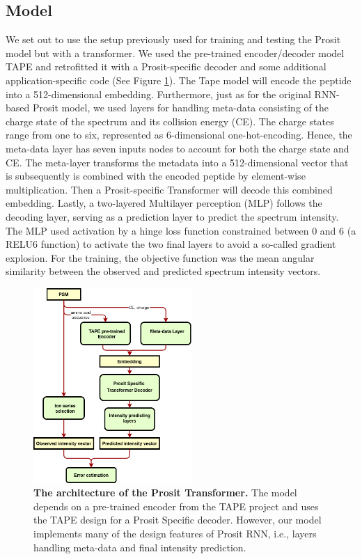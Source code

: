 \documentclass[10pt,a4paper]{article}
\begin{document}
\subsection*{Model}
We set out to use the setup previously used for training and testing the Prosit model but with a transformer. We used the pre-trained encoder/decoder model TAPE \cite{Rao2019-qq} and retrofitted it with a Prosit-specific decoder and some additional application-specific code (See Figure \ref{fig:architecture}). The Tape model will encode the peptide into a 512-dimensional embedding. Furthermore, just as for the original RNN-based Prosit model, we used layers for handling meta-data consisting of the charge state of the spectrum and its collision energy (CE). The charge states range from one to six, represented as 6-dimensional one-hot-encoding. Hence, the meta-data layer has seven inputs nodes to account for both the charge state and CE. The meta-layer transforms the metadata into a 512-dimensional vector that is subsequently is combined with the encoded peptide by element-wise multiplication. Then a Prosit-specific Transformer will decode this combined embedding. Lastly, a two-layered Multilayer perception (MLP) follows the decoding layer, serving as a prediction layer to predict the spectrum intensity. The MLP used activation by a hinge loss function constrained between 0 and 6 (a RELU6 function) to activate the two final layers to avoid a so-called gradient explosion. For the training, the objective function was the mean angular similarity between the observed and predicted spectrum intensity vectors.


\begin{figure}[htb]
\centering
\includegraphics[width=6cm]{./img/architecture.png}
\caption{{\bf The architecture of the Prosit Transformer.} The model depends on a pre-trained encoder from the TAPE project and uses the TAPE design for a Prosit Specific decoder. However, our model implements many of the design features of Prosit RNN, i.e., layers handling meta-data and final intensity prediction. \label{fig:architecture}}
\end{figure}
\end{document}
